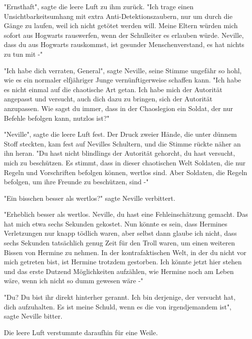 {"Ernsthaft", sagte die leere Luft zu ihm zurück. "Ich trage einen Unsichtbarkeitsumhang mit extra Anti-Detektionszaubern, nur um durch die Gänge zu laufen, weil ich nicht getötet werden will. Meine Eltern würden mich sofort aus Hogwarts rauswerfen, wenn der Schulleiter es erlauben würde. Neville, dass du aus Hogwarts rauskommst, ist gesunder Menschenverstand, es hat nichts zu tun mit -"

"Ich habe dich verraten, General", sagte Neville, seine Stimme ungefähr so hohl, wie es ein normaler elfjähriger Junge vernünftigerweise schaffen kann. "Ich habe es nicht einmal auf die chaotische Art getan. Ich habe mich der Autorität angepasst und versucht, auch dich dazu zu bringen, sich der Autorität anzupassen. Wie sagst du immer, dass in der Chaoslegion ein Soldat, der nur Befehle befolgen kann, nutzlos ist?"

"Neville", sagte die leere Luft fest. Der Druck zweier Hände, die unter dünnem Stoff steckten, kam fest auf Nevilles Schultern, und die Stimme rückte näher an ihn heran. "Du hast nicht blindlings der Autorität gehorcht, du hast versucht, mich zu beschützen. Es stimmt, dass in dieser chaotischen Welt Soldaten, die nur Regeln und Vorschriften befolgen können, wertlos sind. Aber Soldaten, die Regeln befolgen, um ihre Freunde zu beschützen, sind -"

"Ein bisschen besser als wertlos?" sagte Neville verbittert.

"Erheblich besser als wertlos. Neville, du hast eine Fehleinschätzung gemacht. Das hat mich etwa sechs Sekunden gekostet. Nun könnte es sein, dass Hermines Verletzungen nur knapp tödlich waren, aber selbst dann glaube ich nicht, dass sechs Sekunden tatsächlich genug Zeit für den Troll waren, um einen weiteren Bissen von Hermine zu nehmen. In der kontrafaktischen Welt, in der du nicht vor mich getreten bist, ist Hermine trotzdem gestorben. Ich könnte jetzt hier stehen und das erste Dutzend Möglichkeiten aufzählen, wie Hermine noch am Leben wäre, wenn ich nicht so dumm gewesen wäre -"

"Du? Du bist ihr direkt hinterher gerannt. Ich bin derjenige, der versucht hat, dich aufzuhalten. Es ist meine Schuld, wenn es die von irgendjemandem ist", sagte Neville bitter.

Die leere Luft verstummte daraufhin für eine Weile.

}
